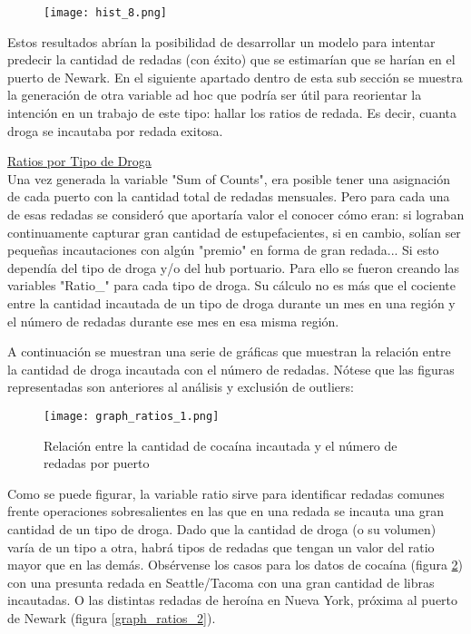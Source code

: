 \documentclass[12pt]{article}
\begin{document}
		\begin{figure}[H]
			\caption{\label{hist_8} }
			\centering
			\hspace*{1cm}
			\texttt{[image: hist\_8.png]}
		\end{figure}
	
		Estos resultados abrían la posibilidad de desarrollar un modelo para intentar predecir la cantidad de redadas (con éxito) que se estimarían que se harían en el puerto de Newark. En el siguiente apartado dentro de esta sub sección se muestra la generación de otra variable ad hoc que podría ser útil para reorientar la intención en un trabajo de este tipo: hallar los ratios de redada. Es decir, cuanta droga se incautaba por redada exitosa.
		
		\underline{Ratios por Tipo de Droga}\\
		Una vez generada la variable "Sum of Counts", era posible tener una asignación de cada puerto con la cantidad total de redadas mensuales. Pero para cada una de esas redadas se consideró que aportaría valor el conocer cómo eran: si lograban continuamente capturar gran cantidad de estupefacientes, si en cambio, solían ser pequeñas incautaciones con algún "premio" en forma de gran redada... Si esto dependía del tipo de droga y/o del hub portuario. Para ello se fueron creando las variables "Ratio\_" para cada tipo de droga. Su cálculo no es más que el cociente entre la cantidad incautada de un tipo de droga durante un mes en una región y el número de redadas durante ese mes en esa misma región.
		
		A continuación se muestran una serie de gráficas que muestran la relación entre la cantidad de droga incautada con el número de redadas. Nótese que las figuras representadas son anteriores al análisis y exclusión de outliers:
		
		\begin{figure}[H]
			\caption{\label{graph_ratios_1} Relación entre la cantidad de cocaína incautada y el número de redadas por puerto}
			\centering
			\hspace*{1cm}
			\texttt{[image: graph\_ratios\_1.png]}
		\end{figure}
	
		Como se puede figurar, la variable ratio sirve para identificar redadas comunes frente operaciones sobresalientes en las que en una redada se incauta una gran cantidad de un tipo de droga. Dado que la cantidad de droga (o su volumen) varía de un tipo a otra, habrá tipos de redadas que tengan un valor del ratio mayor que en las demás. Obsérvense los casos para los datos de cocaína (figura \ref{graph_ratios_1}) con una presunta redada en Seattle/Tacoma con una gran cantidad de libras incautadas. O las distintas redadas de heroína en Nueva York, próxima al puerto de Newark (figura \ref{graph_ratios_2}).
	
\end{document}
